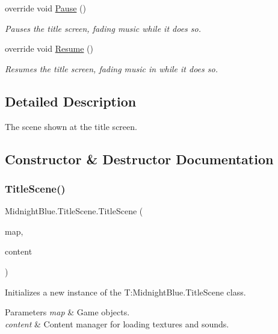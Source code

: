 \begin{DoxyCompactItemize}
override void \hyperlink{class_midnight_blue_1_1_title_scene_a046934bfa3290d443b58bcc1de0919db}{Pause} ()
\begin{DoxyCompactList}\small\item\em Pauses the title screen, fading music while it does so. \end{DoxyCompactList}\item 
override void \hyperlink{class_midnight_blue_1_1_title_scene_afb0bb3ad8b2766b5d57537dc1ef22249}{Resume} ()
\begin{DoxyCompactList}\small\item\em Resumes the title screen, fading music in while it does so. \end{DoxyCompactList}\end{DoxyCompactItemize}


\subsection{Detailed Description}
The scene shown at the title screen. 



\subsection{Constructor \& Destructor Documentation}
\hypertarget{class_midnight_blue_1_1_title_scene_a409eb89a58dbec10d5a0002ce78bc9a3}{}\label{class_midnight_blue_1_1_title_scene_a409eb89a58dbec10d5a0002ce78bc9a3} 
\subsubsection{\texorpdfstring{Title\+Scene()}{TitleScene()}}
{\footnotesize\ttfamily Midnight\+Blue.\+Title\+Scene.\+Title\+Scene (\begin{DoxyParamCaption}\item[{Entity\+Map}]{map,  }\item[{Content\+Manager}]{content }\end{DoxyParamCaption})\hspace{0.3cm}{\ttfamily [inline]}}



Initializes a new instance of the T\+:\+Midnight\+Blue.\+Title\+Scene class. 


\begin{DoxyParams}{Parameters}
{\em map} & Game objects.\\
\hline
{\em content} & Content manager for loading textures and sounds.\\
\hline
\end{DoxyParams}


